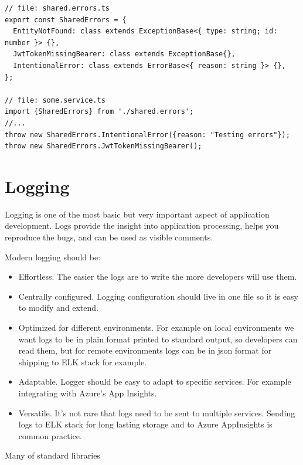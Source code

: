 \documentclass[lang=en,color=green]{elegantbook}
\begin{document}
\begin{verbatim}
// file: shared.errors.ts
export const SharedErrors = {
  EntityNotFound: class extends ExceptionBase<{ type: string; id: number }> {},
  JwtTokenMissingBearer: class extends ExceptionBase{},
  IntentionalError: class extends ErrorBase<{ reason: string }> {},
};

// file: some.service.ts
import {SharedErrors} from './shared.errors';
//...
throw new SharedErrors.IntentionalError({reason: "Testing errors"});
throw new SharedErrors.JwtTokenMissingBearer();

\end{verbatim}

\section{Logging}

Logging is one of the most basic but very important aspect of application development.
Logs provide the insight into application processing, helps you reproduce the bugs,
and can be used as visible comments.

Modern logging should be:
\begin{itemize}
    \item Effortless. The easier the logs are to write the more developers will use them.
    \item Centrally configured. Logging configuration should live in one file so it is easy
          to modify and extend.
    \item Optimized for different environments. For example on local environments we want
          logs to be in plain format printed to standard output, so developers can read them,
          but for remote environments logs can be in json format for shipping to ELK stack for example.
    \item Adaptable. Logger should be easy to adapt to specific services. For example
          integrating with Azure's App Insights.
    \item Versatile. It's not rare that logs need to be sent to multiple services. Sending
          logs to ELK stack for long lasting storage and to Azure AppInsights is common practice.
\end{itemize}

Many of standard libraries 
\end{document}
